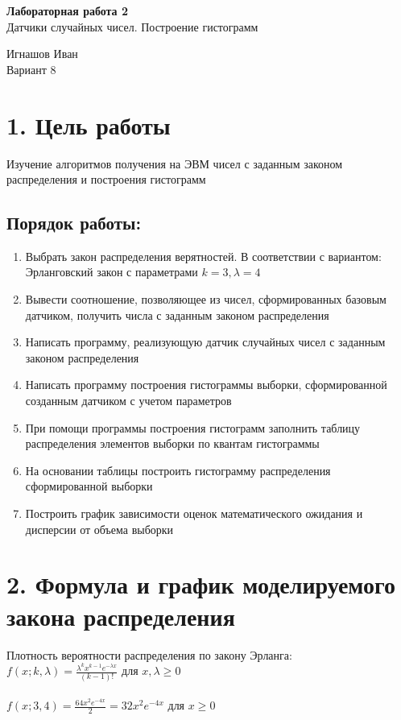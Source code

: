 \documentclass[12pt]{article}
\begin{document}
\begin{center}
	\LARGE 
	\textbf{Лабораторная работа 2}\\
	Датчики случайных чисел. Построение гистограмм\\
\end{center}

\begin{flushright}
	\large
	Игнашов Иван\\
	Вариант 8\\
\end{flushright}

\newpage

 \section*{1. Цель работы}
Изучение алгоритмов получения на ЭВМ чисел с заданным законом
распределения и построения гистограмм

\subsection*{Порядок работы:}
\begin{enumerate}
	\item Выбрать закон распределения верятностей. В соответствии с вариантом: Эрланговский закон с параметрами $k=3, \lambda=4$
	\item Вывести соотношение, позволяющее из чисел, сформированных базовым
датчиком, получить числа с заданным законом распределения
	\item Написать программу, реализующую датчик случайных чисел с заданным
законом распределения
	\item Написать программу построения гистограммы выборки, сформированной
созданным датчиком с учетом параметров
	\item При помощи программы построения гистограмм заполнить таблицу распределения элементов выборки по квантам гистограммы
	\item На основании таблицы построить гистограмму распределения сформированной выборки
	\item Построить график зависимости оценок математического ожидания и
дисперсии от объема выборки
\end{enumerate}

\newpage
 \section*{2. Формула и график моделируемого закона распределения}%
Плотность вероятности распределения по закону Эрланга:\\
$f(x; k, \lambda) = \frac{\lambda^kx^{k - 1}e^{-\lambda x}}{(k-1)!} $ для $ x,\lambda \geq 0$\\ \\
$f(x; 3, 4) = \frac{64x^{2}e^{-4 x}}{2} = 32x^2e^{-4 x} $ для $ x \geq 0$
\end{document}
